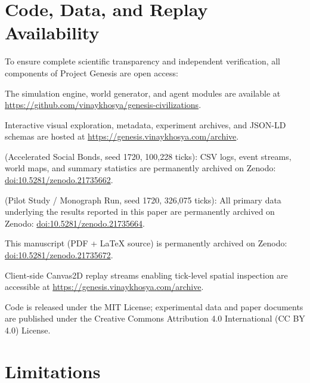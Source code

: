 \documentclass[12pt,a4paper]{article}
\begin{document}
\section{Code, Data, and Replay Availability}

To ensure complete scientific transparency and independent verification, all components of Project Genesis are open access:

\begin{description}[font=\bfseries]
  \item[Source Code:] The simulation engine, world generator, and agent modules are available at \url{https://github.com/vinaykhosya/genesis-civilizations}.
  \item[Research Portal \& Archive:] Interactive visual exploration, metadata, experiment archives, and JSON-LD schemas are hosted at \url{https://genesis.vinaykhosya.com/archive}.
  \item[Dataset --- Experiment 1] (Accelerated Social Bonds, seed 1720, 100,228 ticks): CSV logs, event streams, world maps, and summary statistics are permanently archived on Zenodo: \href{https://doi.org/10.5281/zenodo.21735662}{doi:10.5281/zenodo.21735662}.
  \item[Dataset --- Experiment 2] (Pilot Study / Monograph Run, seed 1720, 326,075 ticks): All primary data underlying the results reported in this paper are permanently archived on Zenodo: \href{https://doi.org/10.5281/zenodo.21735664}{doi:10.5281/zenodo.21735664}.
  \item[Preprint Archive:] This manuscript (PDF + \LaTeX{} source) is permanently archived on Zenodo: \href{https://doi.org/10.5281/zenodo.21735672}{doi:10.5281/zenodo.21735672}.
  \item[Replay Viewer:] Client-side Canvas2D replay streams enabling tick-level spatial inspection are accessible at \url{https://genesis.vinaykhosya.com/archive}.
  \item[License:] Code is released under the MIT License; experimental data and paper documents are published under the Creative Commons Attribution 4.0 International (CC BY 4.0) License.
\end{description}

\section{Limitations}
\end{document}
